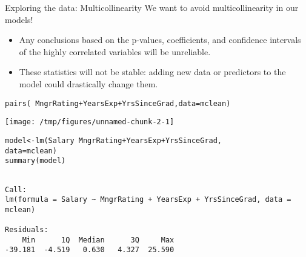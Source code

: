 \documentclass{beamer}\usepackage[]{graphicx}\usepackage[]{color}
\makeatletter
\def\maxwidth{ %
  \ifdim\Gin@nat@width>\linewidth
    \linewidth
  \else
    \Gin@nat@width
  \fi
}
\newcommand{\hlopt}[1]{\textcolor[rgb]{1,0.894,0.769}{#1}}%
\newcommand{\hlstd}[1]{\textcolor[rgb]{1,0.894,0.769}{#1}}%
\newcommand{\hlkwb}[1]{\textcolor[rgb]{0.804,0.776,0.451}{#1}}%
\newcommand{\hlkwc}[1]{\textcolor[rgb]{0.78,0.941,0.545}{#1}}%
\newcommand{\hlkwd}[1]{\textcolor[rgb]{1,0.78,0.769}{#1}}%
\newenvironment{kframe}{%
 \def\at@end@of@kframe{}%
 \ifinner\ifhmode%
  \def\at@end@of@kframe{\end{minipage}}%
  \begin{minipage}{\columnwidth}%
 \fi\fi%
 \def\FrameCommand##1{\hskip\@totalleftmargin \hskip-\fboxsep
 \colorbox{shadecolor}{##1}\hskip-\fboxsep
     \hskip-\linewidth \hskip-\@totalleftmargin \hskip\columnwidth}%
 \MakeFramed {\advance\hsize-\width
   \@totalleftmargin\z@ \linewidth\hsize
   \@setminipage}}%
 {\par\unskip\endMakeFramed%
 \at@end@of@kframe}
\newenvironment{knitrout}{}{} %
\makeatother
\begin{document}
\begin{darkframes}
    \begin{frame}[fragile]{Exploring the data: Multicollinearity}
      We want to avoid multicollinearity in our models! \pause
      \begin{itemize}[<+->]
        \item Any conclusions based on the p-values, coefficients, and confidence intervals of the highly correlated variables will be unreliable.
        \item These statistics will not be stable: adding new data or predictors to the model could drastically change them.
      \end{itemize}
    \end{frame}

    \begin{frame}[fragile]%
      \fontsize{9}{9}\selectfont
\begin{knitrout}
\color{fgcolor}\begin{kframe}
\begin{alltt}
\hlkwd{pairs}\hlstd{(}\hlopt{~} \hlstd{MngrRating} \hlopt{+} \hlstd{YearsExp} \hlopt{+} \hlstd{YrsSinceGrad,} \hlkwc{data}\hlstd{=mclean)}
\end{alltt}
\end{kframe}
\texttt{[image: /tmp/figures/unnamed-chunk-2-1]} 

\end{knitrout}
    \end{frame}

    \begin{frame}[fragile]%
      \fontsize{8}{8}\selectfont
\begin{knitrout}
\color{fgcolor}\begin{kframe}
\begin{alltt}
\hlstd{model} \hlkwb{<-} \hlkwd{lm}\hlstd{(Salary} \hlopt{~} \hlstd{MngrRating} \hlopt{+} \hlstd{YearsExp} \hlopt{+} \hlstd{YrsSinceGrad,}
           \hlkwc{data}\hlstd{=mclean)}
\hlkwd{summary}\hlstd{(model)}
\end{alltt}
\begin{verbatim}

Call:
lm(formula = Salary ~ MngrRating + YearsExp + YrsSinceGrad, data = mclean)

Residuals:
    Min      1Q  Median      3Q     Max 
-39.181  -4.519   0.630   4.327  25.590 


\end{verbatim}
\end{kframe}
\end{knitrout}
\end{frame}
\end{darkframes}
\end{document}
